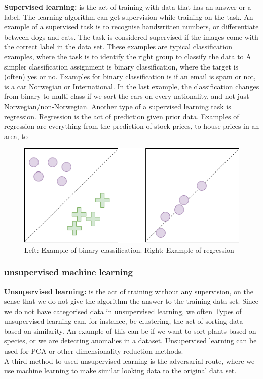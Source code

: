 \textbf{Supervised learning:} is the act of training with data that has an answer or a label. The learning algorithm can get supervision while training on the task. An example of a supervised task is to recognise handwritten numbers, or differentiate between dogs and cats. The task is considered supervised if the images come with the correct label in the data set. These  examples are typical classification examples, where the task is to identify the right group to classify the data to %
A simpler classification assignment is binary classification, where the target is (often) yes or no. Examples for binary classification is if an email is spam or not, is a car Norwegian or International. In the last example, the classification changes from binary to multi-class if we sort the cars on every nationality, and not just Norwegian/non-Norwegian. Another type of a supervised learning task is regression. Regression is the act of prediction given prior data. Examples of regression are everything from the prediction of stock prices, to house prices in an area, to\\ %
\begin{figure}
    \centering
    \includegraphics[scale=0.5]{figures/class_vs_reg.png}
    \caption{Left: Example of binary classification. Right: Example of regression} 
\end{figure}
  


\subsubsection{unsupervised machine learning}
\textbf{Unsupervised learning:} is the act of training without any supervision, on the sense that we do not give the algorithm the answer to the training data set. %
Since we do not have categorised data in unsupervised learning, we often %
Types of unsupervised learning can, for instance, be clustering, the act of sorting data based on similarity.
An example of this can be if we want to sort plants based on species, or we are detecting anomalies in a dataset. Unsupervised learning can be used for PCA %
or other dimensionality reduction methods.\\
A third method to used unsupervised learning is the adversarial route, where we use machine learning to make similar looking data to the original data set. 
        
